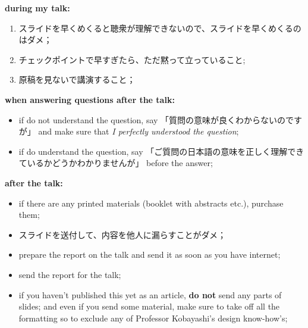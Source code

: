\documentclass[12pt]{article} %
\begin{document}
    \textbf{during my talk:}\begin{enumerate}
	    \item スライドを早くめくると聴衆が理解できないので、スライドを早くめくるのはダメ；
	    \item チェックポイントで早すぎたら、ただ黙って立っていること;
	    \item 原稿を見ないで講演すること；
    \end{enumerate}
	\textbf{when answering questions after the talk:}
	\begin{itemize}
		\item if do not understand the question, say 「質問の意味が良くわからないのですが」 and make sure that \textit{I perfectly understood the question};
		\item if do understand the question, say 「ご質問の日本語の意味を正しく理解できているかどうかわかりませんが」 before the answer;
	\end{itemize}
	\textbf{after the talk:}
	\begin{itemize}
		\item if there are any printed materials (booklet with abstracts etc.), purchase them;
		\item スライドを送付して、内容を他人に漏らすことがダメ；
		\item prepare the report on the talk and send it as soon as you have internet;
        \item send the report for the talk;
        \item if you haven't published this yet as an article, \textbf{do not} send any parts of slides;
            and even if you send some material, make sure to take off all the formatting so to exclude
            any of Professor Kobayashi's design know-how's;
	\end{itemize}
\end{document}
